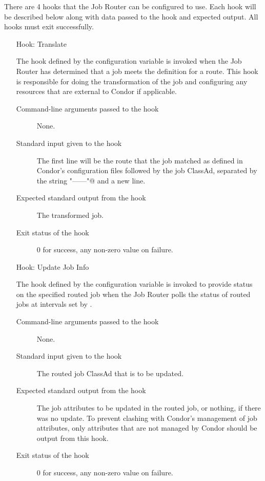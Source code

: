There are 4 hooks that the Job Router can be configured to use.
Each hook will be described below along with data passed 
to the hook and expected output.
All hooks must exit successfully.

\begin{itemize}
\item[Hook: Translate]

  The hook defined by the configuration variable 
  is invoked when the Job Router has determined that a job
  meets the definition for a route.  This hook is responsible for doing the
  transformation of the job and configuring any resources that are external to
  Condor if applicable.

\begin{description}
\item[Command-line arguments passed to the hook]
  None.
\item[Standard input given to the hook]
  The first line will be the route that the job matched as
  defined in Condor's configuration files followed by the job ClassAd,
  separated by the string \verb@"------"@ and a new line.
\item[Expected standard output from the hook]
  The transformed job.
\item[Exit status of the hook]
  0 for success, any non-zero value on failure.
\end{description}


\item[Hook: Update Job Info]

  The hook defined by the configuration variable 
  is invoked to provide status on the specified routed job
  when the Job Router polls the status of routed jobs at intervals
  set by .

\begin{description}
\item[Command-line arguments passed to the hook]
  None.
\item[Standard input given to the hook]
  The routed job ClassAd that is to be updated.
\item[Expected standard output from the hook]
   The job attributes to be updated in the routed job,
   or nothing, if there was no update.
   To prevent clashing with Condor's management of job attributes,
   only attributes that are not managed by Condor should be output
   from this hook.
\item[Exit status of the hook]
  0 for success, any non-zero value on failure.
\end{description}



\end{itemize}
